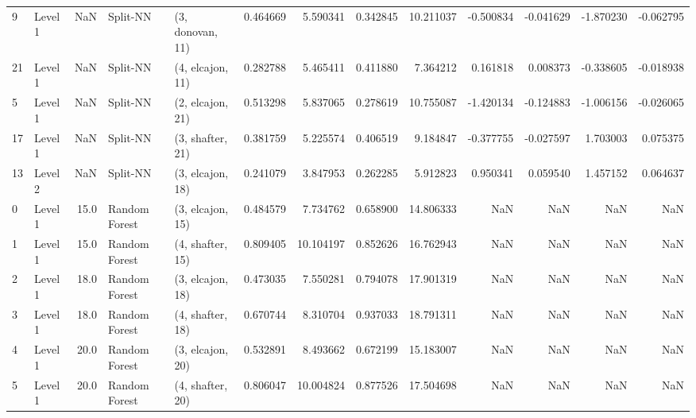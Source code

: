 \begin{tabular}{llrllrrrrrrrr}
9  &   Level 1 &    NaN &       Split-NN &  (3, donovan, 11) &   0.464669 &   5.590341 &  0.342845 &  10.211037 &            -0.500834 &              -0.041629 &           -1.870230 &             -0.062795 \\
21 &   Level 1 &    NaN &       Split-NN &  (4, elcajon, 11) &   0.282788 &   5.465411 &  0.411880 &   7.364212 &             0.161818 &               0.008373 &           -0.338605 &             -0.018938 \\
5  &   Level 1 &    NaN &       Split-NN &  (2, elcajon, 21) &   0.513298 &   5.837065 &  0.278619 &  10.755087 &            -1.420134 &              -0.124883 &           -1.006156 &             -0.026065 \\
17 &   Level 1 &    NaN &       Split-NN &  (3, shafter, 21) &   0.381759 &   5.225574 &  0.406519 &   9.184847 &            -0.377755 &              -0.027597 &            1.703003 &              0.075375 \\
13 &   Level 2 &    NaN &       Split-NN &  (3, elcajon, 18) &   0.241079 &   3.847953 &  0.262285 &   5.912823 &             0.950341 &               0.059540 &            1.457152 &              0.064637 \\
0  &   Level 1 &   15.0 &  Random Forest &  (3, elcajon, 15) &   0.484579 &   7.734762 &  0.658900 &  14.806333 &                  NaN &                    NaN &                 NaN &                   NaN \\
1  &   Level 1 &   15.0 &  Random Forest &  (4, shafter, 15) &   0.809405 &  10.104197 &  0.852626 &  16.762943 &                  NaN &                    NaN &                 NaN &                   NaN \\
2  &   Level 1 &   18.0 &  Random Forest &  (3, elcajon, 18) &   0.473035 &   7.550281 &  0.794078 &  17.901319 &                  NaN &                    NaN &                 NaN &                   NaN \\
3  &   Level 1 &   18.0 &  Random Forest &  (4, shafter, 18) &   0.670744 &   8.310704 &  0.937033 &  18.791311 &                  NaN &                    NaN &                 NaN &                   NaN \\
4  &   Level 1 &   20.0 &  Random Forest &  (3, elcajon, 20) &   0.532891 &   8.493662 &  0.672199 &  15.183007 &                  NaN &                    NaN &                 NaN &                   NaN \\
5  &   Level 1 &   20.0 &  Random Forest &  (4, shafter, 20) &   0.806047 &  10.004824 &  0.877526 &  17.504698 &                  NaN &                    NaN &                 NaN &                   NaN \\

\end{tabular}
